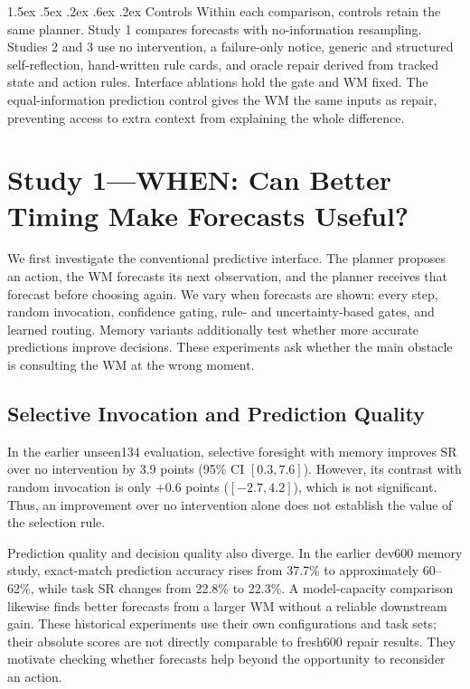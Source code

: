 \documentclass[runningheads]{llncs}
\makeatletter
\renewcommand\paragraph{\@startsection{paragraph}{4}{\z@}%
  {1.5ex \@plus .5ex \@minus .2ex}%
  {.6ex \@plus .2ex}%
  {\normalfont\normalsize\bfseries}}
\makeatother
\begin{document}
\paragraph{Controls}
Within each comparison, controls retain the same planner. Study 1 compares forecasts with no-information resampling. Studies 2 and 3 use no intervention, a failure-only notice, generic and structured self-reflection, hand-written rule cards, and oracle repair derived from tracked state and action rules. Interface ablations hold the gate and WM fixed. The equal-information prediction control gives the WM the same inputs as repair, preventing access to extra context from explaining the whole difference.

\section{Study 1---WHEN: Can Better Timing Make Forecasts Useful?}\label{sec:when}
We first investigate the conventional predictive interface. The planner proposes an action, the WM forecasts its next observation, and the planner receives that forecast before choosing again. We vary when forecasts are shown: every step, random invocation, confidence gating, rule- and uncertainty-based gates, and learned routing. Memory variants additionally test whether more accurate predictions improve decisions. These experiments ask whether the main obstacle is consulting the WM at the wrong moment.

\subsection{Selective Invocation and Prediction Quality}
In the earlier unseen134 evaluation, selective foresight with memory improves SR over no intervention by 3.9 points (95\% CI $[0.3,7.6]$). However, its contrast with random invocation is only $+0.6$ points ($[-2.7,4.2]$), which is not significant. Thus, an improvement over no intervention alone does not establish the value of the selection rule.

Prediction quality and decision quality also diverge. In the earlier dev600 memory study, exact-match prediction accuracy rises from 37.7\% to approximately 60--62\%, while task SR changes from 22.8\% to 22.3\%. A model-capacity comparison likewise finds better forecasts from a larger WM without a reliable downstream gain. These historical experiments use their own configurations and task sets; their absolute scores are not directly comparable to fresh600 repair results. They motivate checking whether forecasts help beyond the opportunity to reconsider an action.
\end{document}
